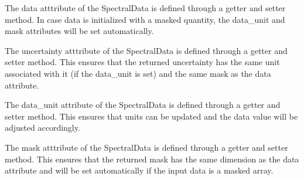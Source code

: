 \documentclass[a4paper,10pt,english]{sphinxmanual}
\begin{document}
\begin{fulllineitems}
\begin{fulllineitems}
\label{\detokenize{cascade.data_model:cascade.data_model.data_model.SpectralData.data}}
The data atttribute of the SpectralData is defined through a
getter and setter method. In case data is initialized with a
masked quantity, the data\_unit and mask attributes will be set
automatically.

\end{fulllineitems}


\begin{fulllineitems}
\label{\detokenize{cascade.data_model:cascade.data_model.data_model.SpectralData.uncertainty}}
The uncertainty atttribute of the SpectralData is defined
through a getter and setter method. This ensures that the
returned uncertainty has the same unit associated with it
(if the data\_unit is set) and the same mask as the data attribute.

\end{fulllineitems}


\begin{fulllineitems}
\label{\detokenize{cascade.data_model:cascade.data_model.data_model.SpectralData.data_unit}}
The data\_unit attribute of the SpectralData is defined
through a getter and setter method. This ensures that units can be
updated and the data value will be adjusted accordingly.

\end{fulllineitems}


\begin{fulllineitems}
\label{\detokenize{cascade.data_model:cascade.data_model.data_model.SpectralData.mask}}
The mask atttribute of the SpectralData is defined
through a getter and setter method. This ensures that the
returned mask has the same dimension as the data attribute and
will be set automatically if the input data is a masked array.

\end{fulllineitems}


\end{fulllineitems}
\end{document}
